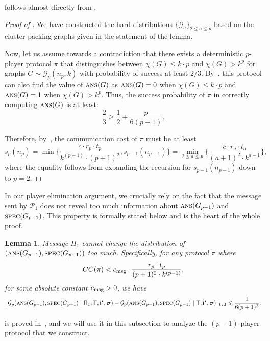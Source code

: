 \documentclass[11pt]{article}
\newtheorem{lemma}{Lemma}[section]
\theoremstyle{definition}
\renewcommand{\leq}{\leqslant}
\renewcommand{\geq}{\geqslant}
\newcommand{\tvd}[2]{\ensuremath{\norm{#1 - #2}_{\mathrm{tvd}}}}
\newcommand{\norm}[1]{\ensuremath{\|#1\|}}
\newcommand{\rv}[1]{\ensuremath{{\mathsf{#1}}}\xspace}
\newcommand{\chrom}{\ensuremath{\chi}}
\newcommand{\player}[1]{\ensuremath{\mathcal{P}_{#1}}}
\newcommand{\cG}{\ensuremath{\mathcal{G}}}
\newcommand{\ans}{\ensuremath{\textnormal{\textsc{ans}}}}
\newcommand{\spec}{\ensuremath{\textnormal{\textsc{spec}}}}
\newcommand{\prot}{\ensuremath{\pi}}
\newcommand{\Prot}{\ensuremath{\Pi}}
\newcommand{\rProt}{\ensuremath{\rv{\Prot}}}
\newcommand{\rT}{\ensuremath{\rv{T}}}
\newcommand{\rsigma}{\ensuremath{\bm{\sigma}}}
\begin{document}
	 follows almost directly from .

	\begin{proof}[Proof of ]
	We have constructed the hard distributions $\{\cG_a\}_{2 \leq a \leq p}$ based on the cluster packing graphs given in the statement of the lemma. 
	
	Now, let us assume towards a contradiction that there exists a deterministic $p$-player protocol $\prot$ that distinguishes between $\chrom(G) \leq k \cdot p$ and $\chrom(G) > k^p$ for graphs $G \sim \cG_p(n_p, k)$ with probability of success at least $2/3$.
	By~, this protocol can also find the value of $\ans(G)$ as  $\ans(G) = 0$ when $\chrom(G) \leq k \cdot p$ and $\ans(G) = 1$ when $\chrom(G) > k^p$. Thus, the success probability of $\prot$ in correctly computing $\ans(G)$ is at least:
	\[
		\frac23 \geq \frac12 + \frac{p}{6(p+1)}.
	\]
	
	Therefore, by~, the communication cost of $\prot$ must be at least 
	\[
		s_p(n_p) = \min\Big\{\frac{c \cdot r_p \cdot t_p}{k^{(p-1)} \cdot (p+1)^2}, s_{p-1}(n_{p-1})\Big\}  = \underset{2 \leq a \leq p}{\min}\Big \{ \frac{c \cdot r_a \cdot t_a}{(a+1)^2 \cdot k^{a-1}}\Big\},
	\]
	where the equality follows from expanding the recursion for $s_{p-1}(n_{p-1})$ down to $p = 2$. 
	\end{proof}

	In our player elimination argument, we crucially rely on the fact that the message sent by $\player{1}$ does not reveal too much information about $\ans(G_{p-1})$ and $\spec(G_{p-1})$. This property is formally stated below
	and is the heart of the whole proof. 

	\begin{lemma}\label{lem:first-msg}
		Message $\rProt_1$ cannot change the distribution of $(\ans(G_{p-1}), \spec(G_{p-1}))$ too much.  Specifically, for any protocol $\prot$ where 
		\[
		CC(\prot) < \cmsg \cdot \frac{r_p \cdot t_p}{(p+1)^2 \cdot  k^{(p-1)}},
		\]
		for some absolute constant $c_{\textnormal{msg}}>0$, we have
		\[
		\tvd{\cG_p(\ans(G_{p-1}), \spec(G_{p-1}) \mid \rProt_1, \rT,\ristar, \rsigma)}{\cG_p(\ans(G_{p-1}), \spec(G_{p-1}) \mid \rT, \ristar, \rsigma)} \leq \frac{1}{6(p+1)^2}.
		\]
	\end{lemma}
	
	 is proved in~, and we will use it in this subsection to analyze the $(p-1)$-player protocol that we construct.
\end{document}
